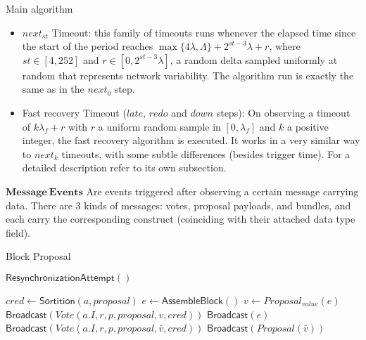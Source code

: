 \documentclass[10pt,a4paper]{article}
\begin{document}
\begin{section}{Main algorithm}
\begin{itemize}
    \item $next_{st}$ Timeout: this family of timeouts runs whenever the elapsed time since the start of the period reaches
    $\max\{4\lambda, \Lambda \} + 2^{st-3}\lambda + r$, where $st\in [4, 252]$ and $r \in [0, 2^{st-3}\lambda]$, a random 
    delta sampled uniformly at random that represents network variability.
    The algorithm run is exactly the same as in the $next_0$ step.

    \item Fast recovery Timeout ($late$, $redo$ and $down$ steps): On observing a timeout of $k\lambda_f + r$ with $r$ a uniform random sample in $[0, \lambda_f]$ and
    $k$ a positive integer, the fast recovery algorithm is executed. It works in a very similar way to $next_k$ timeouts, with some subtle differences (besides trigger time).
    For a detailed description refer to its own subsection.
\end{itemize}


$\mathbf{Message \ Events}$ Are events triggered after observing a certain message carrying data.
There are 3 kinds of messages: votes, proposal payloads, and bundles, and each carry
the corresponding construct (coinciding with their attached data type field).

\begin{subsection}{Block Proposal}\label{ssect:blockproposal}

    \begin{algorithm}
        \caption{\underline{Block proposal}}
        \label{algo:block-proposal}
        \begin{algorithmic}[1]

            \State $\mathsf{ResynchronizationAttempt}()$

                \State $cred \gets 
                \mathsf{Sortition}(a, proposal)$
                        \State $e \gets \mathsf{AssembleBlock}()$
                        \State $v \gets Proposal_{value}(e)$
                        \State $\mathsf{Broadcast}(Vote(a.I, r, p, proposal, v, cred))$
                        \State $\mathsf{Broadcast}(e)$
                    \Else
                        \State $\mathsf{Broadcast}(Vote(a.I, r, p, proposal, \bar{v}, cred))$
                            \State $\mathsf{Broadcast}(Proposal(\bar{v}))$
                        \EndIf
                    \EndIf
                \EndIf
            \EndFor
        \EndFunction
        \end{algorithmic}
    \end{algorithm}


\end{subsection}
\end{section}
\end{document}
